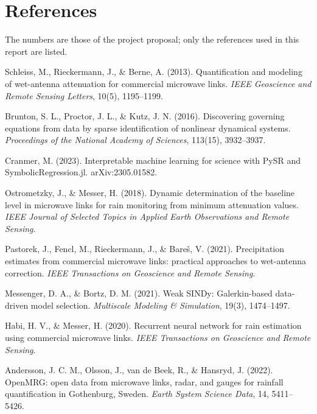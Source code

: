 \documentclass[11pt,a4paper]{article}
\begin{document}
\section*{References}

The numbers are those of the project proposal; only the references used in this report are listed.

\begin{description}[leftmargin=1.1cm, labelwidth=0.9cm, labelsep=0.2cm, font=\normalfont]
\item[{[1]}] Schleiss, M., Rieckermann, J., \& Berne, A. (2013). Quantification and modeling of wet-antenna
attenuation for commercial microwave links. \emph{IEEE Geoscience and Remote Sensing Letters}, 10(5), 1195--1199.
\item[{[6]}] Brunton, S. L., Proctor, J. L., \& Kutz, J. N. (2016). Discovering governing equations from data by
sparse identification of nonlinear dynamical systems. \emph{Proceedings of the National Academy of Sciences},
113(15), 3932--3937.
\item[{[7]}] Cranmer, M. (2023). Interpretable machine learning for science with PySR and SymbolicRegression.jl.
arXiv:2305.01582.
\item[{[8]}] Ostrometzky, J., \& Messer, H. (2018). Dynamic determination of the baseline level in microwave links
for rain monitoring from minimum attenuation values. \emph{IEEE Journal of Selected Topics in Applied Earth
Observations and Remote Sensing}.
\item[{[9]}] Pastorek, J., Fencl, M., Rieckermann, J., \& Bare\v{s}, V. (2021). Precipitation estimates from
commercial microwave links: practical approaches to wet-antenna correction. \emph{IEEE Transactions on Geoscience and
Remote Sensing}.
\item[{[10]}] Messenger, D. A., \& Bortz, D. M. (2021). Weak SINDy: Galerkin-based data-driven model selection.
\emph{Multiscale Modeling \& Simulation}, 19(3), 1474--1497.
\item[{[11]}] Habi, H. V., \& Messer, H. (2020). Recurrent neural network for rain estimation using commercial
microwave links. \emph{IEEE Transactions on Geoscience and Remote Sensing}.
\item[{[13]}] Andersson, J. C. M., Olsson, J., van de Beek, R., \& Hansryd, J. (2022). OpenMRG: open data from
microwave links, radar, and gauges for rainfall quantification in Gothenburg, Sweden. \emph{Earth System Science
Data}, 14, 5411--5426.
\end{description}
\end{document}
